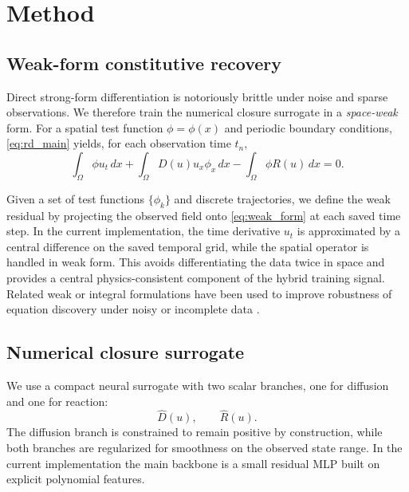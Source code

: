 \documentclass[preprint,12pt]{elsarticle}
\begin{document}
\section{Method}

\subsection{Weak-form constitutive recovery}

Direct strong-form differentiation is notoriously brittle under noise and sparse observations. We therefore train the numerical closure surrogate in a \emph{space-weak} form. For a spatial test function $\phi=\phi(x)$ and periodic boundary conditions, \eqref{eq:rd_main} yields, for each observation time $t_n$,
\begin{equation}
\int_\Omega \phi u_t \, dx
+ \int_\Omega D(u) u_x \phi_x \, dx
- \int_\Omega \phi R(u) \, dx
= 0.
\label{eq:weak_form}
\end{equation}

Given a set of test functions $\{ \phi_k \}$ and discrete trajectories, we define the weak residual by projecting the observed field onto \eqref{eq:weak_form} at each saved time step. In the current implementation, the time derivative $u_t$ is approximated by a central difference on the saved temporal grid, while the spatial operator is handled in weak form. This avoids differentiating the data twice in space and provides a central physics-consistent component of the hybrid training signal. Related weak or integral formulations have been used to improve robustness of equation discovery under noisy or incomplete data \cite{Messenger_2021,Reinbold_2020,Tang_2023}.

\subsection{Numerical closure surrogate}

We use a compact neural surrogate with two scalar branches, one for diffusion and one for reaction:
\begin{equation}
\widehat{D}(u), \qquad \widehat{R}(u).
\end{equation}
The diffusion branch is constrained to remain positive by construction, while both branches are regularized for smoothness on the observed state range. In the current implementation the main backbone is a small residual MLP built on explicit polynomial features.
\end{document}
